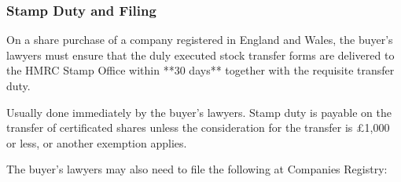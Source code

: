 \documentclass[
]{article}
\newenvironment{Shaded}{}{}
\newcommand{\NormalTok}[1]{#1}
\begin{document}
\hypertarget{stamp-duty-and-filing}{%
\subsubsection{Stamp Duty and Filing}\label{stamp-duty-and-filing}}

\begin{Shaded}
\begin{Highlighting}[]
\NormalTok{On a share purchase of a company registered in England and Wales, the buyer’s lawyers must ensure that the duly executed stock transfer forms are delivered to the HMRC Stamp Office within **30 days** together with the requisite transfer duty.}
\end{Highlighting}
\end{Shaded}

Usually done immediately by the buyer's lawyers. Stamp duty is payable
on the transfer of certificated shares unless the consideration for the
transfer is £1,000 or less, or another exemption applies.

The buyer's lawyers may also need to file the following at Companies
Registry:
\end{document}
